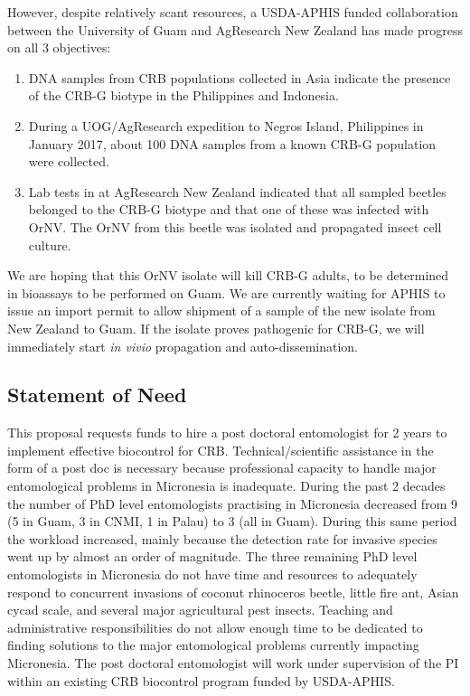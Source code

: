 \documentclass[12pt,letterpaper,english,bibliography=totocnumbered, abstract=on]{scrartcl}
\begin{document}
However, despite relatively scant resources, a USDA-APHIS funded collaboration
between the University of Guam and AgResearch New Zealand has made
progress on all 3 objectives:
\begin{enumerate}
\item DNA samples from CRB populations collected in Asia indicate the presence
of the CRB-G biotype in the Philippines and Indonesia.
\item During a UOG/AgResearch expedition to Negros Island, Philippines in
January 2017, about 100 DNA samples from a known CRB-G population
were collected.
\item Lab tests in at AgResearch New Zealand indicated that all sampled
beetles belonged to the CRB-G biotype and that one of these was infected
with OrNV. The OrNV from this beetle was isolated and propagated insect
cell culture.
\end{enumerate}
We are hoping that this OrNV isolate will kill CRB-G adults, to be
determined in bioassays to be performed on Guam. We are currently
waiting for APHIS to issue an import permit to allow shipment of a
sample of the new isolate from New Zealand to Guam. If the isolate
proves pathogenic for CRB-G, we will immediately start \emph{in vivio}
propagation and auto-dissemination.

\subsection{Statement of Need}

This proposal requests funds to hire a post doctoral entomologist
for 2 years to implement effective biocontrol for CRB. Technical/scientific
assistance in the form of a post doc is necessary because professional
capacity to handle major entomological problems in Micronesia is inadequate.
During the past 2 decades the number of PhD level entomologists practising
in Micronesia decreased from 9 (5 in Guam, 3 in CNMI, 1 in Palau)
to 3 (all in Guam). During this same period the workload increased,
mainly because the detection rate for invasive species went up by
almost an order of magnitude. The three remaining PhD level entomologists
in Micronesia do not have time and resources to adequately respond
to concurrent invasions of coconut rhinoceros beetle, little fire
ant, Asian cycad scale, and several major agricultural pest insects.
Teaching and administrative responsibilities do not allow enough time
to be dedicated to finding solutions to the major entomological problems
currently impacting Micronesia. The post doctoral entomologist will
work under supervision of the PI within an existing CRB biocontrol
program funded by USDA-APHIS. 
\end{document}
